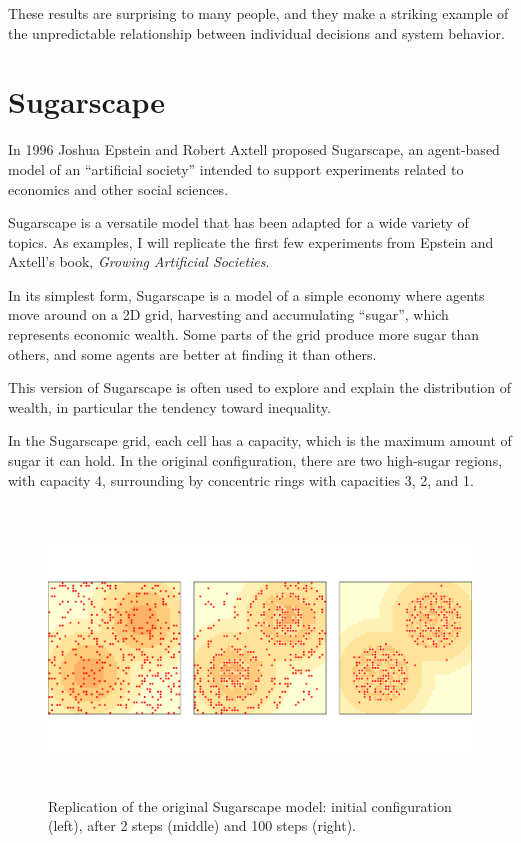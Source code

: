\documentclass[12pt]{book}
\theoremstyle{exercise}
\begin{document}
These results are surprising to many people, and they make a striking
example of the unpredictable relationship between
individual decisions and system behavior.


\section{Sugarscape}

In 1996 Joshua Epstein and Robert Axtell proposed Sugarscape, an
agent-based model of an ``artificial society'' intended to support
experiments related to economics and other social sciences.


Sugarscape is a versatile model that has been adapted for a wide
variety of topics.  As examples, I will replicate the
first few experiments from Epstein and Axtell's book, {\it Growing
Artificial Societies}.


In its simplest form, Sugarscape is a model of a simple economy where
agents move around on a 2D grid, harvesting and accumulating ``sugar'',
which represents economic wealth.  Some parts of the grid produce more
sugar than others, and some agents are better at finding it than
others.


This version of Sugarscape is often used to explore and explain the
distribution of wealth, in particular the tendency toward inequality.

In the Sugarscape grid, each cell has a capacity, which is the maximum
amount of sugar it can hold.  In the original configuration, there
are two high-sugar regions, with capacity 4, surrounding by concentric
rings with capacities 3, 2, and 1.

\begin{figure}
\centerline{\includegraphics[height=3in]{figs/chap09-3.pdf}}
\caption{Replication of the original Sugarscape model: initial
configuration (left), after 2 steps (middle) and 100 steps (right).}
\label{chap09-3}
\end{figure}
\end{document}
